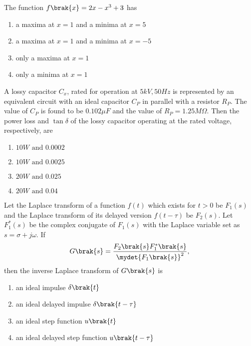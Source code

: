 \iffalse
\chapter{2011}
\author{EE24BTECH11015 - Dhawal}
\section{ee}
\fi
	\item The function $f\brak{x} = 2x - x^3 + 3$ has
\begin{enumerate}
\item a maxima at $x = 1$ and a minima at $x = 5$
\item a maxima at $x = 1$ and a minima at $x = -5$
\item only a maxima at $x = 1$
\item only a minima at $x = 1$
\end{enumerate}


\item A lossy capacitor $C_x$, rated for operation at $5 kV, 50 Hz$ is represented by an equivalent circuit with an ideal capacitor $C_P$ in parallel with a resistor $R_P$. The value of $C_P$ is found to be $0.102\mu F$ and the value of $R_P = 1.25 M\Omega$. Then the power loss and $\tan \delta$ of the lossy capacitor operating at the rated voltage, respectively, are
\begin{multicols}{2}
\begin{enumerate}
\item  $10 W \text{ and } 0.0002$
\item  $10 W \text{ and } 0.0025$
\item  $20 W \text{ and }0.025$
\item  $20 W \text{ and }0.04$
\end{enumerate}
\end{multicols}

\item Let the Laplace transform of a function $f(t)$ which exists for $t > 0$ be $F_1(s)$ and the Laplace transform of its delayed version $f(t - \tau)$ be $F_2(s)$. Let $F_1^*(s)$ be the complex conjugate of $F_1(s)$ with the Laplace variable set as $s = \sigma + j\omega$. If 
\begin{align*}
G\brak{s} = \frac{F_2\brak{s}F_1^*\brak{s}}{\mydet{F_1\brak{s}}^2}, 
\end{align*}
then the inverse Laplace transform of $G\brak{s}$ is
\begin{multicols}{2}
\begin{enumerate}
\item an ideal impulse $\delta\brak{t}$
\item  an ideal delayed impulse $\delta\brak{t - \tau}$
\item  an ideal step function $u\brak{t}$
\item an ideal delayed step function $u\brak{t - \tau}$
\end{enumerate}
\end{multicols}

